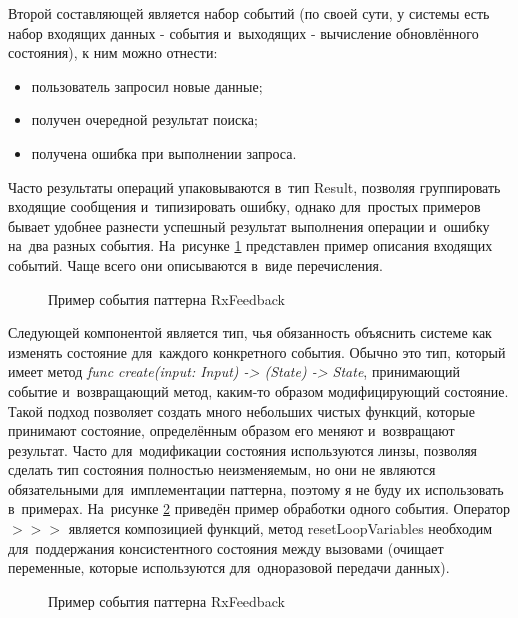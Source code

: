 Второй составляющей является набор событий (по своей сути, у системы есть набор входящих данных - события и~выходящих - вычисление обновлённого состояния), к ним можно отнести:

\begin{itemize}
  \item пользователь запросил новые данные;
  \item получен очередной результат поиска;
  \item получена ошибка при выполнении запроса.
\end{itemize}

Часто результаты операций упаковываются в~тип Result, позволяя группировать входящие сообщения и~типизировать ошибку, однако для~простых примеров бывает удобнее разнести успешный результат выполнения операции и~ошибку на~два разных события. На~рисунке \ref{sec:development:arch:ios:rxfeedback:example:event} представлен пример описания входящих событий. Чаще всего они описываются в~виде перечисления.

\begin{figure}[h]
  
   \caption{Пример события паттерна RxFeedback}
   \label{sec:development:arch:ios:rxfeedback:example:event}
\end{figure}

Следующей компонентой является тип, чья обязанность объяснить системе как изменять состояние для~каждого конкретного события. Обычно это тип, который имеет метод \textit{func create(input: Input) -> (State) -> State}, принимающий событие и~возвращающий метод, каким-то образом модифицирующий состояние. Такой подход позволяет создать много небольших чистых функций, которые принимают состояние, определённым образом его меняют и~возвращают результат. Часто для~модификации состояния используются линзы, позволяя сделать тип состояния полностью неизменяемым, но они не являются обязательными для~имплементации паттерна, поэтому я не буду их использовать в~примерах. На~рисунке \ref{sec:development:arch:ios:rxfeedback:example:mutator} приведён пример обработки одного события. Оператор \(>>>\) является композицией функций, метод resetLoopVariables необходим для~поддержания консистентного состояния между вызовами (очищает переменные, которые используются для~одноразовой передачи данных).

\begin{figure}[h]
  
   \caption{Пример события паттерна RxFeedback}
   \label{sec:development:arch:ios:rxfeedback:example:mutator}
\end{figure}

